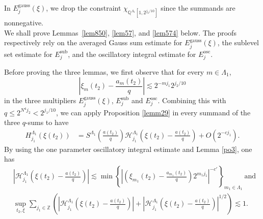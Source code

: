 \documentclass[10pt,a4paper]{amsart}
\numberwithin{equation}{section}
\begin{document}
In $E^{\mathrm{gauss}}_j(\xi)$, we drop the constraint  $\chi_{\mathbb Q^{\Lambda_1}[1,2^{j_2/10}]}$
since the summands are nonnegative.\\


We shall prove Lemmas~\ref{lem850}, \ref{lem57}, and \ref{lem574} below.
The proofs respectively rely on the averaged Gauss sum estimate for
\(E^{\mathrm{gauss}}_j(\xi)\), the sublevel set estimate for
\(E^{\mathrm{sub}}_j\), and the oscillatory integral estimate for
\(E^{\mathrm{osc}}_j\).

Before proving the three lemmas, we first observe that for every $m\in \Lambda_1$,
$$  \left|  \xi_m(t_2)-\frac{a_m(t_2)}{q} \right| \lesssim 2^{-mj_1} 2^{ j_2/10}$$ in the  three multipliers \(E^{\mathrm{gauss}}_j(\xi)\), \(E^{\mathrm{sub}}_j\) and  \(E^{\mathrm{osc}}_j\). Combining   this  with  $q\le 2^{N^4j_2}<2^{j_1/10}$, we can apply Proposition  \ref{lemm29}  in every   summand  of the three $q$-sums to have
\begin{align} \label{2300}
	H^{\Lambda_1}_{j_1}( \xi(t_2) )&=  S^{\Lambda_1}\left(\frac{a(t_2)}{q} \right)  \mathcal{H}^{\Lambda_1}_{j_1}\left( \xi(t_2)-\frac{a(t_2)}{q}\right)+O(2^{-cj_1}).
\end{align}
By using the one parameter oscillatory integral estimate and Lemma \ref{po3}, one has
\begin{align}
	&\left|\mathcal{H}^{\Lambda_1}_{j_1}\left(\xi(t_2)-\frac{a(t_2)}{q}\right)\right| \lesssim\min\left\{ \left|\left(\xi_{m_1}(t_2)-\frac{a_{m_1}(t_2)}{q}\right)2^{m_1 j_1}\right|^{-c'}\right\}_{m_1\in \Lambda_1}\ \text{and}\   \label{hees}\\
	&\sup_{t_2,\xi}\sum_{j_1\in \mathbb{Z}}\left( \left|\mathcal{H}^{\Lambda_1}_{j_1}\left(\xi(t_2)-\frac{a(t_2)}{q}\right)\right|   + \left|\mathcal{H}^{\Lambda_1}_{j_1}\left(\xi(t_2)-\frac{a(t_2)}{q}\right)\right|^{1/2} \right)  \lesssim 1. \label{2203}
\end{align}
\end{document}
